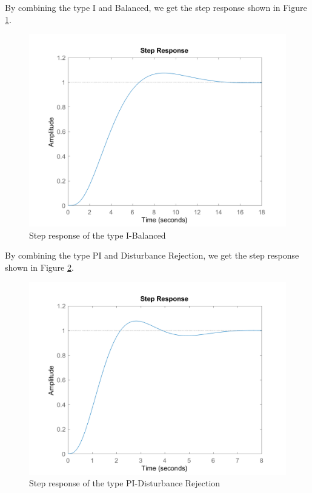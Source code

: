 \documentclass[a4paper, twocolumn, titlepage, 10pt]{article}
\begin{document}
		By combining the type I and Balanced, we get the step response shown in Figure \ref{I-balance-step}.
		\begin{figure}[H]
			\centering
			\includegraphics[width=\linewidth]{I-balance-step}
			\caption{Step response of the type I-Balanced}
			\label{I-balance-step}
		\end{figure}
		By combining the type PI and Disturbance Rejection, we get the step response shown in Figure \ref{PI-rej-step}.
		\begin{figure}[H]
			\centering
			\includegraphics[width=\linewidth]{PI-rej-step}
			\caption{Step response of the type PI-Disturbance Rejection}
			\label{PI-rej-step}
		\end{figure}
\end{document}
